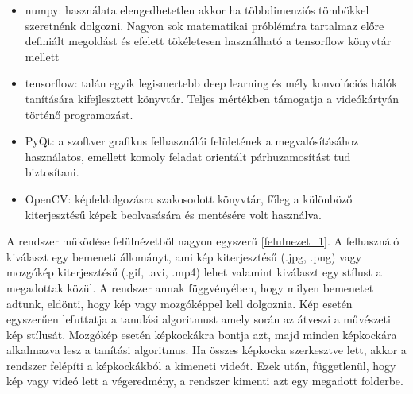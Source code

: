 \documentclass[12pt, a4paper, oneside]{book}
\theoremstyle{tetel}
\begin{document}
\begin{itemize}
	\item numpy\cite{24}: használata elengedhetetlen akkor ha többdimenziós tömbökkel szeretnénk dolgozni. Nagyon sok matematikai próblémára tartalmaz előre definiált megoldást és efelett tökéletesen használható a tensorflow könyvtár mellett
	\item tensorflow\cite{7}: talán egyik legismertebb deep learning és mély konvolúciós hálók tanítására kifejlesztett könyvtár. Teljes mértékben támogatja a videókártyán történő programozást.
	\item PyQt\cite{25}: a szoftver grafikus felhasználói felületének a megvalósításához használatos, emellett komoly feladat orientált párhuzamosítást tud biztosítani.
	\item OpenCV\cite{26}: képfeldolgozásra szakosodott könyvtár, főleg a különböző kiterjesztésű képek beolvasására és mentésére volt használva.
\end{itemize}

A rendszer működése felülnézetből nagyon egyszerű \ref{felulnezet_1}. A felhasználó kiválaszt egy bemeneti állományt, ami kép kiterjesztésű (.jpg, .png) vagy mozgókép kiterjesztésű (.gif, .avi, .mp4) lehet valamint kiválaszt egy stílust a megadottak közül. A rendszer annak függvényében, hogy milyen bemenetet adtunk, eldönti, hogy kép vagy mozgóképpel kell dolgoznia. Kép esetén egyszerűen lefuttatja a tanulási algoritmust amely során az átveszi a művészeti kép stílusát. Mozgókép esetén képkockákra bontja azt, majd minden képkockára alkalmazva lesz a tanítási algoritmus. Ha összes képkocka szerkesztve lett, akkor a rendszer felépíti a képkockákból a kimeneti videót. Ezek után, függetlenül, hogy kép vagy videó lett a végeredmény, a rendszer kimenti azt egy megadott folderbe.
\end{document}
